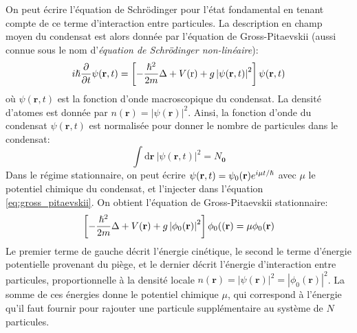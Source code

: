On peut écrire l'équation de Schrödinger pour l'état fondamental en tenant compte de ce terme d'interaction entre particules. La description en champ moyen du condensat est alors donnée par l'équation de Gross-Pitaevskii (aussi connue sous le nom d'\emph{équation de Schrödinger non-linéaire}):
\begin{equation}
i\hslash \frac{\partial}{\partial t} \psi(\mathbf{r},t)=\left[-\frac{\hslash^2}{2m}\Delta +V(\mathrm{r})+g\left| \psi(\mathbf{r},t) \right|^2 \right] \psi(\mathbf{r},t)
\label{eq:gross_pitaevskii}
\end{equation}
où $\psi(\mathbf{r},t)$ est la fonction d'onde macroscopique du condensat. La densité d'atomes est donnée par $n(\mathbf{r})= \left| \psi(\mathbf{r}) \right|^2$. Ainsi, la fonction d'onde du condensat $\psi(\mathbf{r},t)$ est normalisée pour donner le nombre de particules dans le condensat:
\begin{equation}
\int{\mathrm{d}\mathbf{r} \: \left| \psi(\mathbf{r},t) \right|^2}=N_{\mathbf{0}}
\end{equation}
Dans le régime stationnaire, on peut écrire $\psi(\mathbf{r},t)=\psi_0(\mathbf{r}) e^{i\mu t/\hslash}$ avec $\mu$ le potentiel chimique du condensat, et l'injecter dans l'équation \ref{eq:gross_pitaevskii}. On obtient l'équation de Gross-Pitaevskii stationnaire:
\begin{equation}
\left[ -\frac{\hslash^2}{2m}\Delta + V(\mathbf{r}) + g\left|\phi_0(\mathbf{r})\right|^2 \right] \phi_0((\mathbf{r}) = \mu \phi_0(\mathbf{r})
\end{equation}
Le premier terme de gauche décrit l'énergie cinétique, le second le terme d'énergie potentielle provenant du piège, et le dernier décrit l'énergie d'interaction entre particules, proportionnelle à la densité locale $n(\mathbf{r})=\left| \psi(\mathbf{r})\right|^2=\left| \phi_0(\mathbf{r}) \right|^2$. La somme de ces énergies donne le potentiel chimique $\mu$, qui correspond à l'énergie qu'il faut fournir pour rajouter une particule supplémentaire au système de $N$ particules.

